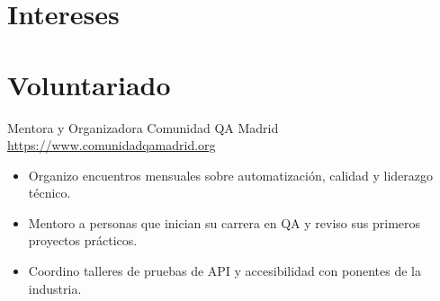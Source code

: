 \documentclass[a4paper, serif, 10pt]{moderncv}
\begin{document}
\section{Intereses}

\section{Voluntariado}

        {Mentora y Organizadora}
        {Comunidad QA Madrid}
        {\url{https://www.comunidadqamadrid.org}}
        {}
        {\begin{itemize}
\item Organizo encuentros mensuales sobre automatización, calidad y liderazgo técnico.
\item Mentoro a personas que inician su carrera en QA y reviso sus primeros proyectos prácticos.
\item Coordino talleres de pruebas de API y accesibilidad con ponentes de la industria.
\end{itemize}}
    
\end{document}
